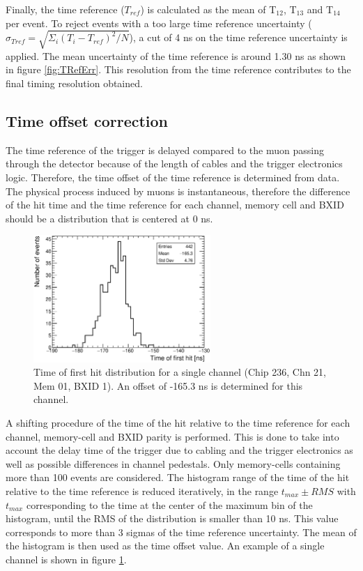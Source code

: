 \documentclass{JINST}
\begin{document}
Finally, the time reference ($T_{ref}$) is calculated as the mean of T$_{12}$, T$_{13}$ and T$_{14}$ per event. To reject events with a too large time reference uncertainty ($\sigma_{T{ref}} = \sqrt{\Sigma_i (T_{i} - T_{ref})^{2}/N}$), a cut of 4 ns on the time reference uncertainty is applied. The mean uncertainty of the time reference is around 1.30 ns as shown in figure \ref{fig:TRefErr}. This resolution from the time reference contributes to the final timing resolution obtained.

\subsection{Time offset correction}
\label{sec:TimeOffset}

The time reference of the trigger is delayed compared to the muon passing through the detector because of the length of cables and the trigger electronics logic. Therefore, the time offset of the time reference is determined from data. The physical process induced by muons is instantaneous, therefore the difference of the hit time and the time reference for each channel, memory cell and BXID should be a distribution that is centered at 0 ns.

\begin{figure}[htbp!]
  \centering
  \includegraphics[width=0.6\textwidth]{fig/Timing_Chip236_Chn21_Mem01_BXID1_withOffset.eps}
  \caption{Time of first hit distribution for a single channel (Chip 236, Chn 21, Mem 01, BXID 1). An offset of -165.3 ns is determined for this channel.}\label{fig:TimeChnwithOffset}
\end{figure}

A shifting procedure of the time of the hit relative to the time reference for each channel, memory-cell and BXID parity is performed. This is done to take into account the delay time of the trigger due to cabling and the trigger electronics as well as possible differences in channel pedestals. Only memory-cells containing more than 100 events are considered. The histogram range of the time of the hit relative to the time reference is reduced iteratively, in the range $t_{max} \pm RMS$ with $t_{max}$ corresponding to the time at the center of the maximum bin of the histogram, until the RMS of the distribution is smaller than 10 ns. This value corresponds to more than 3 sigmas of the time reference uncertainty. The mean of the histogram is then used as the time offset value. An example of a single channel is shown in figure \ref{fig:TimeChnwithOffset}.
\end{document}
